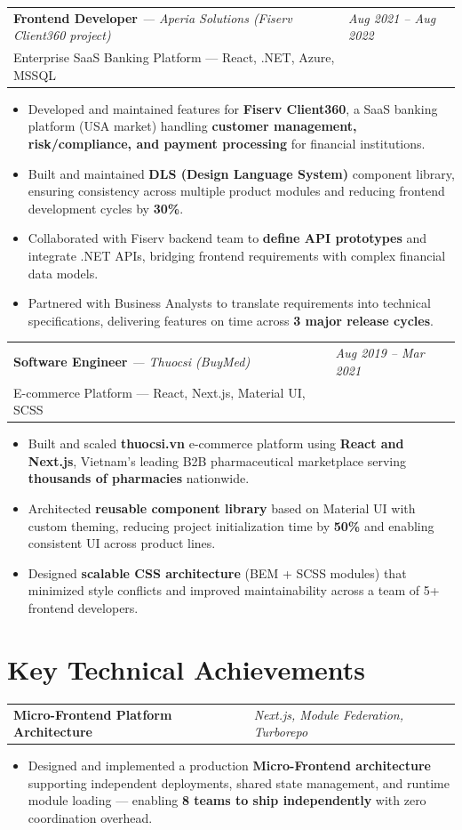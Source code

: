 \documentclass[a4paper,11pt]{article}
\newcommand{\resumeSubheading}[4]{
  \vspace{-1pt}\noindent
  \begin{tabularx}{\textwidth}{X >{\raggedleft\arraybackslash}p{4.2cm}}
    \textbf{#1} \textit{\small --- #2} & \textit{\small #3} \\
    \small #4 & \\
  \end{tabularx}\vspace{-6pt}
}
\newcommand{\resumeProjectHeading}[2]{
  \vspace{-1pt}\noindent
  \begin{tabularx}{\textwidth}{X >{\raggedleft\arraybackslash}p{4.2cm}}
    \textbf{#1} & \textit{\small #2} \\
  \end{tabularx}\vspace{-6pt}
}
\newcommand{\resumeItemListStart}{\begin{itemize}[leftmargin=0.2in, label=\textbullet, itemsep=1pt, parsep=0pt]}
\newcommand{\resumeItemListEnd}{\end{itemize}\vspace{-4pt}}
\newcommand{\resumeItem}[1]{\item\small{#1}}
\begin{document}
\resumeSubheading
  {Frontend Developer}{Aperia Solutions (Fiserv Client360 project)}{Aug 2021 -- Aug 2022}
  {Enterprise SaaS Banking Platform --- React, .NET, Azure, MSSQL}

\resumeItemListStart
  \resumeItem{Developed and maintained features for \textbf{Fiserv Client360}, a SaaS banking platform (USA market) handling \textbf{customer management, risk/compliance, and payment processing} for financial institutions.}
  \resumeItem{Built and maintained \textbf{DLS (Design Language System)} component library, ensuring consistency across multiple product modules and reducing frontend development cycles by \textbf{30\%}.}
  \resumeItem{Collaborated with Fiserv backend team to \textbf{define API prototypes} and integrate .NET APIs, bridging frontend requirements with complex financial data models.}
  \resumeItem{Partnered with Business Analysts to translate requirements into technical specifications, delivering features on time across \textbf{3 major release cycles}.}
\resumeItemListEnd

\resumeSubheading
  {Software Engineer}{Thuocsi (BuyMed)}{Aug 2019 -- Mar 2021}
  {E-commerce Platform --- React, Next.js, Material UI, SCSS}

\resumeItemListStart
  \resumeItem{Built and scaled \textbf{thuocsi.vn} e-commerce platform using \textbf{React and Next.js}, Vietnam's leading B2B pharmaceutical marketplace serving \textbf{thousands of pharmacies} nationwide.}
  \resumeItem{Architected \textbf{reusable component library} based on Material UI with custom theming, reducing project initialization time by \textbf{50\%} and enabling consistent UI across product lines.}
  \resumeItem{Designed \textbf{scalable CSS architecture} (BEM + SCSS modules) that minimized style conflicts and improved maintainability across a team of 5+ frontend developers.}
\resumeItemListEnd

\section{Key Technical Achievements}

\resumeProjectHeading{Micro-Frontend Platform Architecture}{Next.js, Module Federation, Turborepo}
\resumeItemListStart
  \resumeItem{Designed and implemented a production \textbf{Micro-Frontend architecture} supporting independent deployments, shared state management, and runtime module loading --- enabling \textbf{8 teams to ship independently} with zero coordination overhead.}
\resumeItemListEnd
\end{document}
